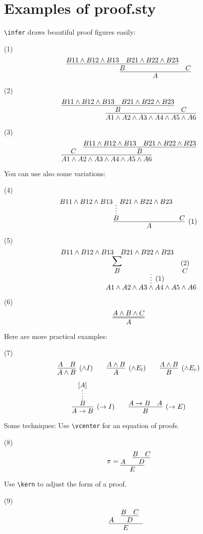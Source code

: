 \documentclass[]{article}
\begin{document}
\section*{Examples of proof.sty}

\verb|\infer| draws beautiful proof figures easily:

\noindent (1)
$$
\infer{A}{
	\infer{B}{
		B11\land B12\land B13
		&
		B21\land B22\land B23
	}
	&
	C
}
$$

\noindent (2)
$$
\infer{A1\land A2\land A3\land A4\land A5\land A6}{
	\infer{B}{
		B11\land B12\land B13
		&
		B21\land B22\land B23
	}
	&
	C
}
$$

\noindent (3)
$$
\infer{A1\land A2\land A3\land A4\land A5\land A6}{
	C
	&
	\infer{B}{
		B11\land B12\land B13
		&
		B21\land B22\land B23
	}
}
$$

You can use also some variations:

\noindent (4)
$$
\infer[(1)]{A}{
	\infer*{B}{
		B11\land B12\land B13
		&
		B21\land B22\land B23
	}
	&
	C
}
$$

\noindent (5)
$$
\infer*[(1)]{A1\land A2\land A3\land A4\land A5\land A6}{
	\deduce[{\displaystyle \sum}]{B}{
		B11\land B12\land B13
		&
		B21\land B22\land B23
	}
	&
	\deduce{C}{(2)}
}
$$

\noindent (6)
$$
\infer={A}{A \land B \land C}
$$

Here are more practical examples:

\noindent (7)
$$
\infer[(\land I)]{A \land B}{A & B}
\qquad
\infer[(\land E_l)]A{A\land B}
\qquad
\infer[(\land E_r)]B{A\land B}
$$

$$
\infer[(\imp I)]{A \imp B}{
	\infer*{B}{[A]}
}
\qquad
\infer[(\imp E)]{B}{
	A \imp B
	&
	A
}
$$

Some techniques:
Use \verb|\vcenter| for an equation of proofs.

\noindent (8)
$$
\pi = \vcenter{
\infer{E}{
	A
	&
	\infer{D}{B & C}
}
}
$$

Use \verb|\kern| to adjust the form of a proof.

\noindent (9)
$$
\infer{E}{
	A
	&
	\infer{D}{B & C} \kern 0.5cm
}
$$
\end{document}
